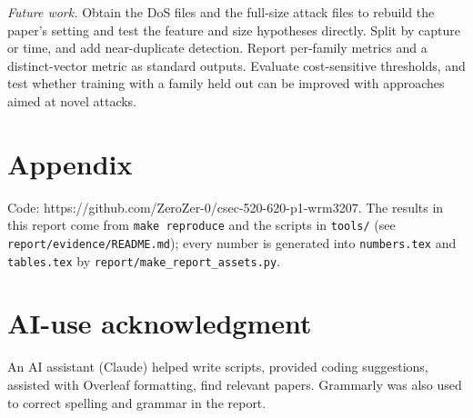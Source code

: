 \documentclass[conference]{IEEEtran}
\begin{document}
\emph{Future work.} Obtain the DoS files and the full-size attack files to rebuild the paper's setting and test the feature and size hypotheses directly. Split by capture or time, and add near-duplicate detection. Report per-family metrics and a distinct-vector metric as standard outputs. Evaluate cost-sensitive thresholds, and test whether training with a family held out can be improved with approaches aimed at novel attacks.

\section*{Appendix}
Code: https://github.com/ZeroZer-0/csec-520-620-p1-wrm3207. The results in this report come from \texttt{make reproduce} and the scripts in \texttt{tools/} (see \texttt{report/evidence/README.md}); every number is generated into \texttt{numbers.tex} and \texttt{tables.tex} by \texttt{report/make\_report\_assets.py}.

\section*{AI-use acknowledgment}
An AI assistant (Claude) helped write scripts, provided coding suggestions, assisted with Overleaf formatting, find relevant papers. Grammarly was also used to correct spelling and grammar in the report.



\end{document}
